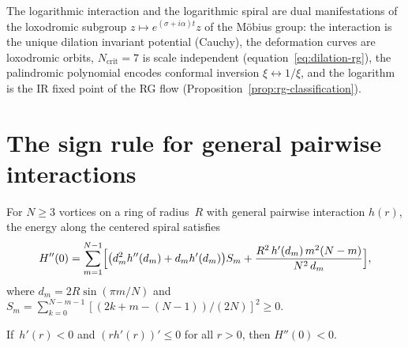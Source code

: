 \begin{remark}
\label{rem:loxodromic}
The logarithmic interaction and the logarithmic spiral are dual
manifestations of the loxodromic subgroup
$z \mapsto e^{(\sigma + i\alpha)t}z$ of the M\"obius group:
the interaction is the unique dilation invariant potential
(Cauchy), the deformation curves are loxodromic orbits,
$N_{\mathrm{crit}} = 7$ is scale independent
(equation~\eqref{eq:dilation-rg}), the palindromic polynomial
encodes conformal inversion $\xi \leftrightarrow 1/\xi$,
and the logarithm is the IR fixed point of the RG flow
(Proposition~\ref{prop:rg-classification}).
\end{remark}


\section{The sign rule for general pairwise interactions}
\label{sec:sign-rule}

\begin{theorem}\label{thm:sign-rule}
For $N \ge 3$ vortices on a ring of radius~$R$ with general pairwise
interaction $h(r)$, the energy along the centered spiral satisfies
\begin{equation}\label{eq:Hpp-general}
  H''(0) = \sum_{m=1}^{N-1}\Bigl[
    \bigl(d_m^2 h''(d_m) + d_m h'(d_m)\bigr) S_m
    + \frac{R^2\,h'(d_m)\, m^2(N-m)}{N^2\, d_m}
  \Bigr],
\end{equation}
where $d_m = 2R\sin(\pi m/N)$ and
$S_m = \sum_{k=0}^{N-m-1}[(2k+m-(N{-}1))/(2N)]^2 \ge 0$.

If\, $h'(r) < 0$ and $(rh'(r))' \le 0$ for all $r > 0$, then
$H''(0) < 0$.
\end{theorem}

